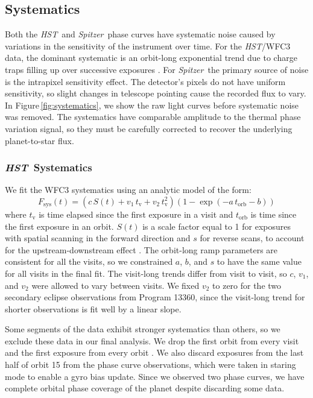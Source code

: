 \documentclass[twocolumn]{aastex61}
\newcommand{\project}[1]{\textsl{#1}}
\newcommand{\HST}{\project{HST}}
\newcommand{\Spitzer}{\project{Spitzer}}
\begin{document}
\subsection{Systematics}
Both the \HST\ and \Spitzer\ phase curves have systematic noise caused by variations in the sensitivity of the instrument over time. For the \HST/WFC3 data, the dominant systematic is an orbit-long exponential trend due to charge traps filling up over successive exposures \citep{long15, zhou17}. For \Spitzer\, the primary source of noise is the intrapixel sensitivity effect. The detector's pixels do not have uniform sensitivity, so slight changes in telescope pointing cause the recorded flux to vary. In Figure\,\ref{fig:systematics}, we show the raw light curves before systematic noise was removed. The systematics have comparable amplitude to the thermal phase variation signal, so they must be carefully corrected to recover the underlying planet-to-star flux. 

\subsubsection{\HST\ Systematics}
\label{sec:hst_sys}
We fit the WFC3 systematics using an analytic model of the form:
\begin{equation}
 F_\mathrm{sys}(t) = (c\,S(t) + v_1\,t_\mathrm{v} + v_2\,t_\mathrm{v}^2)(1 - \exp(-a\,t_\mathrm{orb} - b))
\end{equation}
where $t_\mathrm{v}$ is time elapsed since the first exposure in a visit and $t_\mathrm{orb}$ is time since the first exposure in an orbit. $S(t)$ is a scale factor equal to 1 for exposures with spatial scanning in the forward direction and $s$ for reverse scans, to account for the upstream-downstream effect \citep{mccullough12}. The orbit-long ramp parameters are consistent for all the visits, so we constrained $a$, $b$, and $s$ to have the same value for all visits in the final fit. The visit-long trends differ from visit to visit, so $c$, $v_1$, and $v_2$ were allowed to vary between visits. We fixed $v_2$ to zero for the two secondary eclipse observations from Program 13360, since the visit-long trend for shorter observations is fit well by a linear slope.

Some segments of the data exhibit stronger systematics than others, so we exclude these data in our final analysis. We drop the first orbit from every visit and the first exposure from every orbit \citep[following common practice; see e.g.][]{kreidberg14a}.  We also discard exposures from the last half of orbit 15 from the phase curve observations, which were taken in staring mode to enable a gyro bias update. Since we observed two phase curves, we have complete orbital phase coverage of the planet despite discarding some data.
\end{document}
